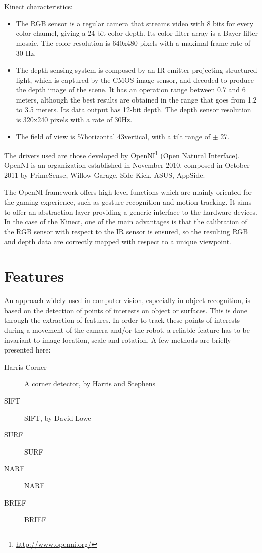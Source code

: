 Kinect characteristics:
\begin{itemize}
 \item The RGB sensor is a regular camera that streams video with 8 bits for every color channel, giving a 24-bit color depth. Its  color filter array is a Bayer filter mosaic. The color resolution is 640x480 pixels with a maximal frame rate of 30 Hz.
 \item The depth sensing system is composed by an IR emitter projecting structured light, which is captured by the CMOS image sensor, and decoded to produce the depth image of the scene. It has an operation range between 0.7 and 6 meters, although the best results are obtained in the range that goes from 1.2 to 3.5 meters. Its data output has 12-bit depth. The depth sensor resolution is 320x240 pixels with a rate of 30Hz.
 \item The field of view is 57\textdegree horizontal 43\textdegree vertical, with a tilt range of $\pm$ 27\textdegree.
\end{itemize}

The drivers used are those developed by OpenNI\footnote{\url{http://www.openni.org/}} (Open Natural Interface). OpenNI is an organization established in November 2010, composed in October 2011 by PrimeSense, Willow Garage, Side-Kick, ASUS, AppSide.

The OpenNI framework offers high level functions which are mainly oriented for the gaming experience, such as gesture recognition and motion tracking. It aims to offer an abstraction layer providing a generic interface to the hardware devices. In the case of the Kinect, one of the main advantages is that the calibration of the RGB sensor with respect to the IR sensor is ensured, so the resulting RGB and depth data are correctly mapped with respect to a unique viewpoint.


\section{Features}

An approach widely used in computer vision, especially in object recognition, is based on the detection of points of interests on object or surfaces. This is done through the extraction of features. In order to track these points of interests during a movement of the camera and/or the robot, a reliable feature has to be invariant to image location, scale and rotation. A few methods are briefly presented here:

\begin{description}
\item[Harris Corner] A corner detector, by Harris and Stephens~\cite{Harris88alvey}
\item[\acrshort{SIFT}]\acrlong{SIFT}, by David Lowe~\cite{lowe_2004_sift} 
\item[\acrshort{SURF}]\acrlong{SURF}~\cite{surf}
\item[\acrshort{NARF}]\acrlong{NARF}~\cite{steder10irosws}
\item[\acrshort{BRIEF}]\acrlong{BRIEF}~\cite{Calonder10-brief}
\end{description}

